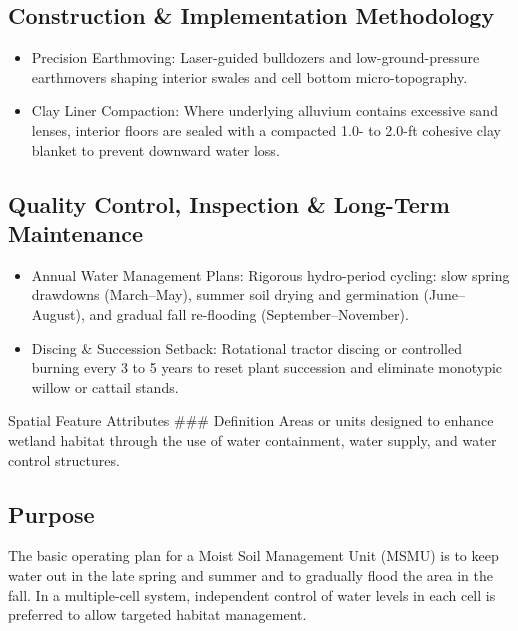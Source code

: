 \documentclass[
  letterpaper,
  DIV=11,
  numbers=noendperiod]{scrreprt}
\begin{document}
\subsection{Construction \& Implementation
Methodology}\label{construction-implementation-methodology-8}

\begin{itemize}
\item
  Precision Earthmoving: Laser-guided bulldozers and low-ground-pressure
  earthmovers shaping interior swales and cell bottom micro-topography.
\item
  Clay Liner Compaction: Where underlying alluvium contains excessive
  sand lenses, interior floors are sealed with a compacted 1.0- to
  2.0-ft cohesive clay blanket to prevent downward water loss.
\end{itemize}

\subsection{Quality Control, Inspection \& Long-Term
Maintenance}\label{quality-control-inspection-long-term-maintenance-8}

\begin{itemize}
\item
  Annual Water Management Plans: Rigorous hydro-period cycling: slow
  spring drawdowns (March--May), summer soil drying and germination
  (June--August), and gradual fall re-flooding (September--November).
\item
  Discing \& Succession Setback: Rotational tractor discing or
  controlled burning every 3 to 5 years to reset plant succession and
  eliminate monotypic willow or cattail stands.
\end{itemize}

Spatial Feature Attributes \#\#\# Definition Areas or units designed to
enhance wetland habitat through the use of water containment, water
supply, and water control structures.

\subsection{Purpose}\label{purpose-10}

The basic operating plan for a Moist Soil Management Unit (MSMU) is to
keep water out in the late spring and summer and to gradually flood the
area in the fall. In a multiple-cell system, independent control of
water levels in each cell is preferred to allow targeted habitat
management.
\end{document}
